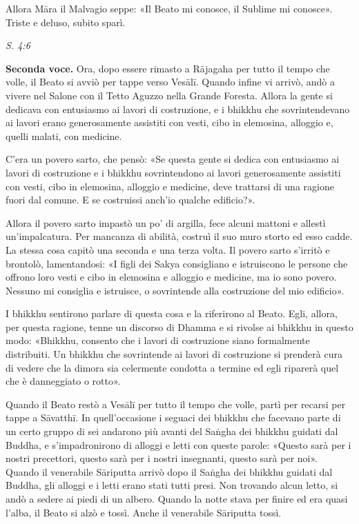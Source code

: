 Allora Māra il Malvagio seppe: «Il Beato mi conosce, il Sublime mi
conosce». Triste e deluso, subito sparì.


\emph{S. 4:6}


\textbf{Seconda voce.} Ora, dopo essere rimasto a Rājagaha per tutto il tempo che
volle, il Beato si avviò per tappe verso Vesālī. Quando infine vi
arrivò, andò a vivere nel Salone con il Tetto Aguzzo nella Grande
Foresta. Allora la gente si dedicava con entusiasmo ai lavori di
costruzione, e i bhikkhu che sovrintendevano ai lavori erano
generosamente assistiti con vesti, cibo in elemosina, alloggio e, quelli
malati, con medicine.


C’era un povero sarto, che pensò: «Se questa gente si dedica con
entusiasmo ai lavori di costruzione e i bhikkhu sovrintendono ai lavori
generosamente assistiti con vesti, cibo in elemosina, alloggio e
medicine, deve trattarsi di una ragione fuori dal comune. E se
costruissi anch’io qualche edificio?».


Allora il povero sarto impastò un po’ di argilla, fece alcuni mattoni e
allestì un’impalcatura. Per mancanza di abilità, costruì il suo muro
storto ed esso cadde. La stessa cosa capitò una seconda e una terza
volta. Il povero sarto s’irritò e brontolò, lamentandosi: «I figli dei
Sakya consigliano e istruiscono le persone che offrono loro vesti e cibo
in elemosina e alloggio e medicine, ma io sono povero. Nessuno mi
consiglia e istruisce, o sovrintende alla costruzione del mio edificio».


I bhikkhu sentirono parlare di questa cosa e la riferirono al Beato.
Egli, allora, per questa ragione, tenne un discorso di Dhamma e si
rivolse ai bhikkhu in questo modo: «Bhikkhu, consento che i lavori di
costruzione siano formalmente distribuiti. Un bhikkhu che sovrintende ai
lavori di costruzione si prenderà cura di vedere che la dimora sia
celermente condotta a termine ed egli riparerà quel che è danneggiato o
rotto».


Quando il Beato restò a Vesālī per tutto il tempo che volle, partì per
recarsi per tappe a Sāvatthī. In quell’occasione i seguaci dei bhikkhu
che facevano parte di un certo gruppo di sei andarono più avanti del
Saṅgha dei bhikkhu guidati dal Buddha, e s’impadronirono di alloggi e
letti con queste parole: «Questo sarà per i nostri precettori, questo
sarà per i nostri insegnanti, questo sarà per noi». Quando il venerabile
Sāriputta arrivò dopo il Saṅgha dei bhikkhu guidati dal Buddha, gli
alloggi e i letti erano stati tutti presi. Non trovando alcun letto, si
andò a sedere ai piedi di un albero. Quando la notte stava per finire ed
era quasi l’alba, il Beato si alzò e tossì. Anche il venerabile
Sāriputta tossì.


